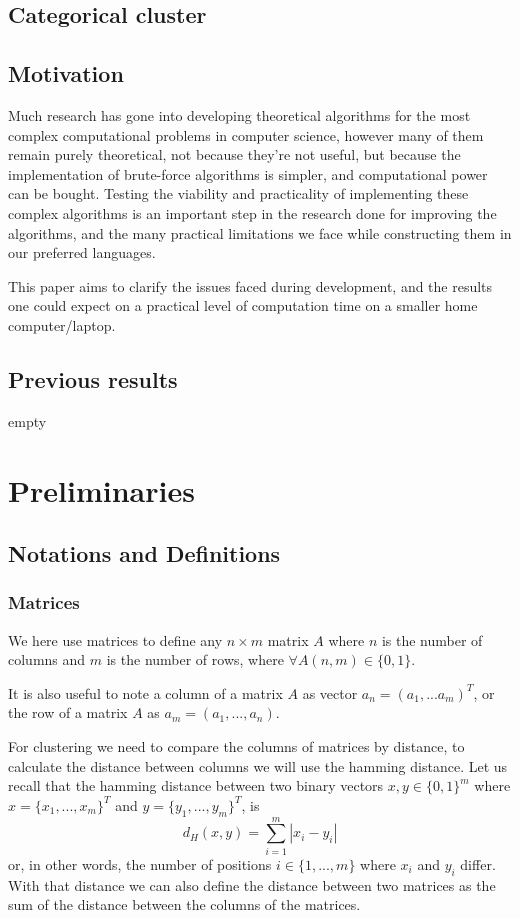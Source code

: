 \documentclass[a4paper]{article}
\begin{document}
\subsection{Categorical cluster}

\subsection{Motivation}
Much research has gone into developing theoretical algorithms for the most complex computational 
problems in computer science, however many of them remain purely theoretical, not because 
they're not useful, but because the implementation of brute-force algorithms is simpler, and 
computational power can be bought. Testing the viability and practicality of implementing 
these complex algorithms is an important step in the research done for improving the 
algorithms, and the many practical limitations we face while constructing them in our 
preferred languages.


This paper aims to clarify the issues faced during development, and the results one could expect 
on a practical level of computation time on a smaller home computer/laptop.

\subsection{Previous results}
empty

%
%
\newpage

\section{Preliminaries}
\subsection{Notations and Definitions}
\subsubsection{Matrices}
We here use matrices to define any $n \times m$ matrix $A$ where $n$ is the number of columns 
and $m$ is the number of rows, where $\forall A(n,m) \in \{0,1\}$.


It is also useful to note a column of a matrix $A$ as vector $a_n = (a_1,...a_m)^T$, or the row
of a matrix $A$ as $a_m = (a_1,...,a_n)$.


For clustering we need to compare the columns of matrices by distance, to calculate the distance
between columns we will use the hamming distance. Let us recall that the hamming distance
between two binary vectors $x,y \in \{0,1\}^m$ where $x=\{x_1,...,x_m\}^T$ and 
$y=\{y_1,...,y_m\}^T$, is 
\[
    d_H(x,y)= \sum_{i = 1}^{m} |x_i - y_i|
\]
or, in other words, the 
number of positions $i \in \{1,...,m\}$ where $x_i$ and $y_i$ differ. With that distance we can
also define the distance between two matrices as the sum of the distance between the columns of
the matrices.
\end{document}
